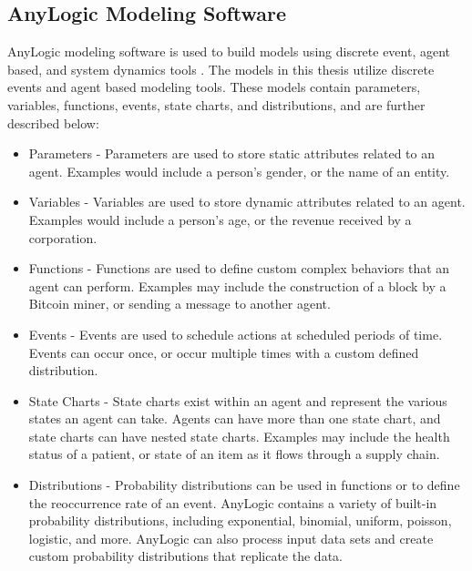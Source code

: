 \documentclass[12pt]{report}
\begin{document}
\subsection{AnyLogic Modeling Software}
\label{sec:anylogic}
AnyLogic modeling software is used to build models using discrete event, agent based, and system dynamics tools \cite{AnyLogic.2018}. The models in this thesis utilize discrete events and agent based modeling tools. These models contain parameters, variables, functions, events, state charts, and distributions, and are further described below:
\begin{itemize}
\item Parameters - Parameters are used to store static attributes related to an agent. Examples would include a person's gender, or the name of an entity.
\item Variables - Variables are used to store dynamic attributes related to an agent. Examples would include a person's age, or the revenue received by a corporation.
\item Functions - Functions are used to define custom complex behaviors that an agent can perform. Examples may include the construction of a block by a Bitcoin miner, or sending a message to another agent.
\item Events - Events are used to schedule actions at scheduled periods of time. Events can occur once, or occur multiple times with a custom defined distribution.
\item State Charts - State charts exist within an agent and represent the various states an agent can take. Agents can have more than one state chart, and state charts can have nested state charts. Examples may include the health status of a patient, or state of an item as it flows through a supply chain.
\item Distributions - Probability distributions can be used in functions or to define the reoccurrence rate of an event. AnyLogic contains a variety of built-in probability distributions, including exponential, binomial, uniform, poisson, logistic, and more. AnyLogic can also process input data sets and create custom probability distributions that replicate the data.
\end{itemize}
\end{document}
